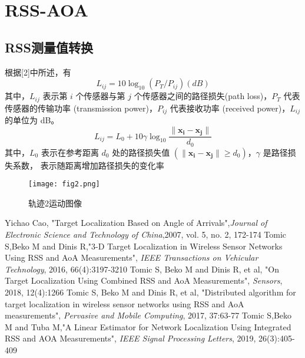 \documentclass[UTF8]{ctexart}
\begin{document}
\section{RSS-AOA}
\subsection{RSS测量值转换}
根据[2]中所述，有
\begin{equation}
    L_{ij} = 10\log_{10} (P_T/P_{ij}) (dB)
\end{equation}
其中，$L_{ij}$ 表示第 $i$ 个传感器与第 $j$ 个传感器之间的路径损失(path loss)，$P_T$ 代表
传感器的传输功率 (transmission power)，$P_{ij}$ 代表接收功率 (received power)，$L_{ij}$ 的单位为 dB。
\begin{equation}
    L_{ij} = L_0 + 10 \gamma \log_{10} \frac{\| \bm{x_i}-\bm{x_j} \| }{d_0}
\end{equation}
其中，$L_0$ 表示在参考距离 $d_0$ 处的路径损失值 $(\| \bm{x_i}- \bm{x_j} \| \geq d_0)$，$\gamma$ 是路径损失系数，
表示随距离增加路径损失的变化率
\begin{figure}
    \centering
    \texttt{[image: fig2.png]}
    \caption{轨迹2运动图像}
\end{figure}

\small
\begin{thebibliography}{00}
     Yichao Cao, "Target Localization Based on Angle of Arrivals",\emph{Journal of Electronic Science and Technology of China},2007, vol. 5, no. 2, 172-174
     Tomic S,Beko M and Dinis R,"3-D Target Localization in Wireless Sensor Networks Using RSS and AoA Measurements",
    \emph{IEEE Transactions on Vehicular Technology}, 2016, 66(4):3197-3210
     Tomic S, Beko M and Dinis R, et al, "On Target Localization Using Combined RSS and AoA Measurements", \emph{Sensors}, 2018, 12(4):1266
     Tomic S, Beko M and Dinis R, et al, "Distributed algorithm for target localization in wireless sensor networks using RSS and AoA measurements",
    \emph{Pervasive and Mobile Computing}, 2017, 37:63-77
     Tomic S,Beko M and Tuba M,"A Linear Estimator for Network Localization Using Integrated RSS and AOA Measurements",
    \emph{IEEE Signal Processing Letters}, 2019, 26(3):405-409

\end{thebibliography}
\end{document}
